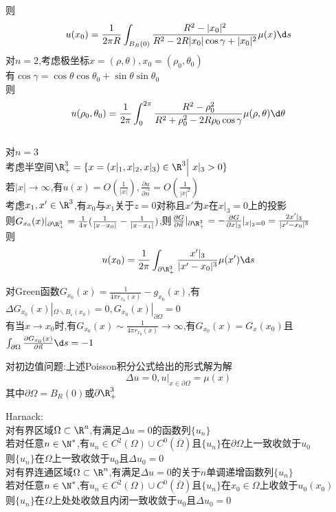 \begin{jie}
则\[u(x_0)=\frac{1}{2\pi R}\int_{B_{R}(0)}\frac{R^2-|x_0|^2}{R^2-2R|x_0|\cos \gamma+|x_0|^2}\mu(x)\d s\]
对$n=2$,考虑极坐标$x=(\rho,\theta),x_0=(\rho_0,\theta_0)$\\
有$\cos\gamma=\cos\theta\cos\theta_0+\sin\theta\sin\theta_0$\\
则\[u(\rho_0,\theta_0)=\frac{1}{2\pi}\int_{0}^{2\pi}\frac{R^2-\rho_0^2}{R^2+\rho_0^2-2R\rho_0\cos\gamma}\mu(\rho,\theta)\d\theta\]\\
\hspace*{2em}对$n=3$\\
考虑半空间$\R^{3}_{+}=\{x=(x|_1,x|_2,x|_3)\in\R^3\Big|\  x|_3>0\}$\\
若$|x|\to \infty$,有$u(x)=O(\frac{1}{|x|}),\frac{\partial u}{\partial \vec{n}}=O(\frac{1}{|x|^2})$\\
考虑$x_1,x'\in \R^3$,有$x_0$与$x_1$关于$z=0$对称且$x'$为$x$在$x|_3=0$上的投影\\
则$G_{x_0}(x)|_{\partial \R^3_{+}}=\frac{1}{4\pi}(\frac{1}{|x-x_0|}-\frac{1}{|x-x_1|})$,则$\frac{\partial G}{\partial \vec{n}}|_{\partial \R^3_{+}}=-\frac{\partial G}{\partial x|_3}|_{x|_3=0}=\frac{2x'|_{3}}{|x'-x_0|^{3}}$\\
则\[u(x_0)=\frac{1}{2\pi }\int_{\partial \R^{3}_{+}}\frac{x'|_{3}}{|x'-x_0|^{3}}\mu(x')\d s\]
\end{jie}

\begin{zhu}
对Green函数$G_{x_0}(x)=\frac{1}{4\pi r_{x_0}(x)}-g_{x_0}(x)$,有$\Delta G_{x_0}(x)|_{\Omega\backslash B_{\varepsilon}(x_0)}=0,G_{x_0}(x)|_{\partial \Omega}=0$\\
有当$x\to x_0$时,有$G_{x_0}(x)\sim \frac{1}{4\pi r_{x_0}(x)}\to \infty$,有$G_{x_0}(x)=G_{x}(x_0)$且$\int_{\partial \Omega}\frac{\partial G_{x_0}(x)}{\partial \vec{n}}\d s=-1$
\end{zhu}

\begin{dingli*}
对初边值问题:上述Poisson积分公式给出的形式解为解
\[\Delta u=0,u|_{x\in\partial\Omega}=\mu(x)\]
其中$\partial \Omega=B_{R}(0)$或$\partial \R^3_{+}$
\end{dingli*}

\begin{dingli}
Harnack:\\
对有界区域$\Omega\subset \R^n$,有满足$\Delta u=0$的函数列$\{u_n\}$\\
若对任意$n\in\N^*$,有$u_n\in C^{2}(\Omega)\cup C^{0}(\overline{\Omega})$且$\{u_n\}$在$\partial \Omega$上一致收敛于$u_0$\\
则$\{u_n\}$在$\Omega$上一致收敛于$u_0$且$\Delta u_0=0$\\
对有界连通区域$\Omega\subset \R^n$,有满足$\Delta u=0$的关于$n$单调递增函数列$\{u_n\}$\\
若对任意$n\in\N^*$,有$u_n\in C^{2}(\Omega)\cup C^{0}(\overline{\Omega})$且$\{u_n\}$在$x_0\in \Omega$上收敛于$u_0(x_0)$\\
则$\{u_n\}$在$\Omega$上处处收敛且内闭一致收敛于$u_0$且$\Delta u_0=0$
\end{dingli}


